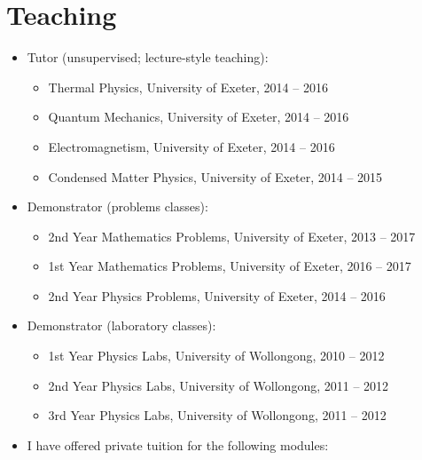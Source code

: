 \documentclass[11pt,a4paper,sans]{moderncv}        %
\begin{document}
\section{Teaching}
\vspace{5pt}
\small{
\begin{itemize}
\item Tutor (unsupervised; lecture-style teaching):
\begin{itemize}
\item Thermal Physics, University of Exeter, 2014 -- 2016
\item Quantum Mechanics, University of Exeter, 2014 -- 2016
\item Electromagnetism, University of Exeter, 2014 -- 2016
\item Condensed Matter Physics, University of Exeter, 2014 -- 2015
\end{itemize}
\item Demonstrator (problems classes):
\begin{itemize}
\item 2nd Year Mathematics Problems, University of Exeter, 2013 -- 2017
\item 1st Year Mathematics Problems, University of Exeter, 2016 -- 2017
\item 2nd Year Physics Problems, University of Exeter, 2014 -- 2016
\end{itemize}
\item Demonstrator (laboratory classes):
\begin{itemize}
\item 1st Year Physics Labs, University of Wollongong, 2010 -- 2012
\item 2nd Year Physics Labs, University of Wollongong, 2011 -- 2012
\item 3rd Year Physics Labs, University of Wollongong, 2011 -- 2012
\end{itemize}
\item I have offered private tuition for the following modules:
\vspace{-10pt}
\begin{multicols}{2}
\end{multicols}
\end{itemize}}
\end{document}
